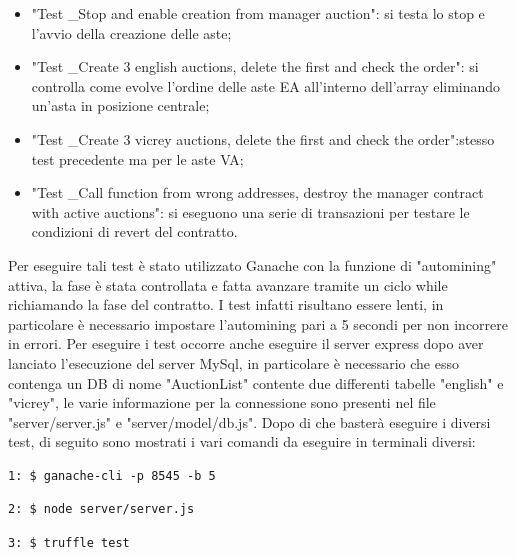 \begin{itemize}
		\item "Test \_Stop and enable creation from manager auction": si testa lo stop e l'avvio della creazione delle aste;
	\item "Test \_Create 3 english auctions, delete the first and check the order": si controlla come evolve l'ordine delle aste EA all'interno dell'array eliminando un'asta in posizione centrale;
	\item "Test \_Create 3 vicrey auctions, delete the first and check the order":stesso test precedente ma per le aste VA;
	\item "Test \_Call function from wrong addresses, destroy the manager contract with active auctions": si eseguono una serie di transazioni per testare le condizioni di revert del contratto.
\end{itemize}
Per eseguire tali test è stato utilizzato Ganache con la funzione di "automining" attiva, la fase è stata controllata e fatta avanzare tramite un ciclo while richiamando la fase del contratto. I test infatti risultano essere lenti, in particolare è necessario impostare l'automining pari a 5 secondi per non incorrere in errori. Per eseguire i test occorre anche eseguire il server express dopo aver lanciato l'esecuzione del server MySql, in particolare è necessario che esso contenga un DB di nome "AuctionList" contente due differenti tabelle "english" e "vicrey", le varie informazione per la connessione sono presenti nel file "server/server.js" e "server/model/db.js". Dopo di che basterà eseguire i diversi test, di seguito sono mostrati i vari comandi da eseguire in terminali diversi:
\begin{verbatim}
1: $ ganache-cli -p 8545 -b 5
\end{verbatim}
\begin{verbatim}
2: $ node server/server.js
\end{verbatim}
\begin{verbatim}
3: $ truffle test 
\end{verbatim}

